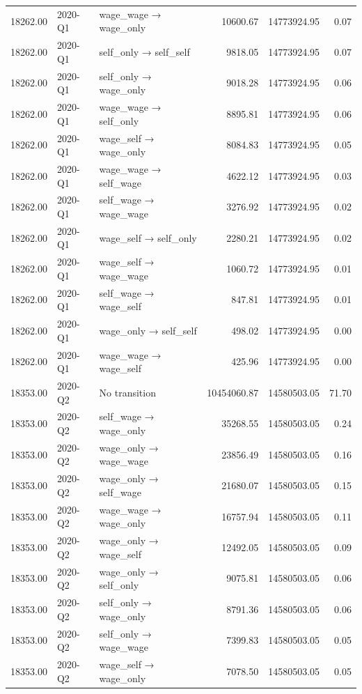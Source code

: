 \begin{table}[ht]
{\begin{tabular}{rllrrr}
  18262.00 & 2020-Q1 & wage\_wage → wage\_only & 10600.67 & 14773924.95 & 0.07 \\ 
  18262.00 & 2020-Q1 & self\_only → self\_self & 9818.05 & 14773924.95 & 0.07 \\ 
  18262.00 & 2020-Q1 & self\_only → wage\_only & 9018.28 & 14773924.95 & 0.06 \\ 
  18262.00 & 2020-Q1 & wage\_wage → self\_only & 8895.81 & 14773924.95 & 0.06 \\ 
  18262.00 & 2020-Q1 & wage\_self → wage\_only & 8084.83 & 14773924.95 & 0.05 \\ 
  18262.00 & 2020-Q1 & wage\_wage → self\_wage & 4622.12 & 14773924.95 & 0.03 \\ 
  18262.00 & 2020-Q1 & self\_wage → wage\_wage & 3276.92 & 14773924.95 & 0.02 \\ 
  18262.00 & 2020-Q1 & wage\_self → self\_only & 2280.21 & 14773924.95 & 0.02 \\ 
  18262.00 & 2020-Q1 & wage\_self → wage\_wage & 1060.72 & 14773924.95 & 0.01 \\ 
  18262.00 & 2020-Q1 & self\_wage → wage\_self & 847.81 & 14773924.95 & 0.01 \\ 
  18262.00 & 2020-Q1 & wage\_only → self\_self & 498.02 & 14773924.95 & 0.00 \\ 
  18262.00 & 2020-Q1 & wage\_wage → wage\_self & 425.96 & 14773924.95 & 0.00 \\ 
  18353.00 & 2020-Q2 & No transition & 10454060.87 & 14580503.05 & 71.70 \\ 
  18353.00 & 2020-Q2 & self\_wage → wage\_only & 35268.55 & 14580503.05 & 0.24 \\ 
  18353.00 & 2020-Q2 & wage\_only → wage\_wage & 23856.49 & 14580503.05 & 0.16 \\ 
  18353.00 & 2020-Q2 & wage\_only → self\_wage & 21680.07 & 14580503.05 & 0.15 \\ 
  18353.00 & 2020-Q2 & wage\_wage → wage\_only & 16757.94 & 14580503.05 & 0.11 \\ 
  18353.00 & 2020-Q2 & wage\_only → wage\_self & 12492.05 & 14580503.05 & 0.09 \\ 
  18353.00 & 2020-Q2 & wage\_only → self\_only & 9075.81 & 14580503.05 & 0.06 \\ 
  18353.00 & 2020-Q2 & self\_only → wage\_only & 8791.36 & 14580503.05 & 0.06 \\ 
  18353.00 & 2020-Q2 & self\_only → wage\_wage & 7399.83 & 14580503.05 & 0.05 \\ 
  18353.00 & 2020-Q2 & wage\_self → wage\_only & 7078.50 & 14580503.05 & 0.05 \\ 

\end{tabular}}
\end{table}
